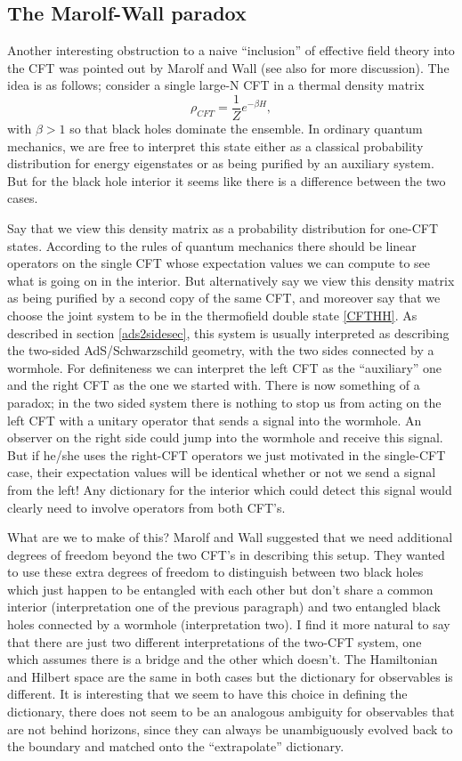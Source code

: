 \documentclass[12pt]{article}
\newcommand{\be}{\begin{equation}}
\newcommand{\ee}{\end{equation}}
\begin{document}
\subsection{The Marolf-Wall paradox}\label{mwsec}
Another interesting obstruction to a naive ``inclusion'' of effective field theory into the CFT was pointed out by Marolf and Wall \cite{Marolf:2012xe} (see also \cite{Avery:2013exa} for more discussion).  The idea is as follows; consider a single large-N CFT in a thermal density matrix
\be
\rho_{CFT}=\frac{1}{Z}e^{-\beta H},
\ee
with $\beta>1$ so that black holes dominate the ensemble.  In ordinary quantum mechanics, we are free to interpret this state either as a classical probability distribution for energy eigenstates or as being purified by an auxiliary system.  But for the black hole interior it seems like there is a difference between the two cases.  

Say that we view this density matrix as a probability distribution for one-CFT states.  According to the rules of quantum mechanics there should be linear operators on the single CFT whose expectation values we can compute to see what is going on in the interior.  But alternatively say we view this density matrix as being purified by a second copy of the same CFT, and moreover say that we choose the joint system to be in the thermofield double state \eqref{CFTHH}.  As described in section \ref{ads2sidesec}, this system is usually interpreted as describing the two-sided AdS/Schwarzschild geometry, with the two sides connected by a wormhole.  For definiteness we can interpret the left CFT as the ``auxiliary'' one and the right CFT as the one we started with.  There is now something of a paradox; in the two sided system there is nothing to stop us from acting on the left CFT with a unitary operator that sends a signal into the wormhole.  An observer on the right side could jump into the wormhole and receive this signal.  But if he/she uses the right-CFT operators we just motivated in the single-CFT case, their expectation values will be identical whether or not we send a signal from the left!  Any dictionary for the interior which could detect this signal would clearly need to involve operators from both CFT's.   

What are we to make of this?  Marolf and Wall suggested that we need additional degrees of freedom beyond the two CFT's in describing this setup.  They wanted to use these extra degrees of freedom to distinguish between two black holes which just happen to be entangled with each other but don't share a common interior (interpretation one of the previous paragraph) and two entangled black holes connected by a wormhole (interpretation two).  I find it more natural to say that there are just two different interpretations of the two-CFT system, one which assumes there is a bridge and the other which doesn't.  The Hamiltonian and Hilbert space are the same in both cases but the dictionary for observables is different.  It is interesting that we seem to have this choice in defining the dictionary, there does not seem to be an analogous ambiguity for observables that are not behind horizons, since they can always be unambiguously evolved back to the boundary and matched onto the ``extrapolate'' dictionary.  
\end{document}

